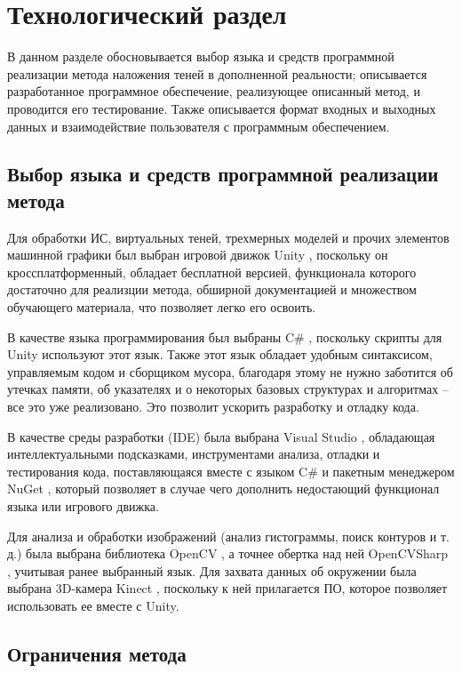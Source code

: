 \chapter{Технологический раздел}

В данном разделе обосновывается выбор языка и средств программной реализации метода наложения теней в дополненной реальности; описывается разработанное программное обеспечение, реализующее описанный метод, и проводится его тестирование. Также описывается формат входных и выходных данных и взаимодействие пользователя с программным обеспечением.

\section{Выбор языка и средств программной реализации метода}

Для обработки ИС, виртуальных теней, трехмерных моделей и прочих элементов машинной графики был выбран игровой движок Unity \cite{unity}, поскольку он кроссплатформенный, обладает бесплатной версией, функционала которого достаточно для реализции метода, обширной документацией и множеством обучающего материала, что позволяет легко его освоить. 

В качестве языка программирования был выбраны C\# \cite{c-sharp}, поскольку скрипты для Unity используют этот язык. Также этот язык обладает удобным синтаксисом, управляемым кодом и сборщиком мусора, благодаря этому не нужно заботится об утечках памяти, об указателях и о некоторых базовых структурах и алгоритмах -- все это уже реализовано. Это позволит ускорить разработку и отладку кода.

В качестве среды разработки (IDE) была выбрана Visual Studio \cite{vs}, обладающая интеллектуальными подсказками, инструментами анализа, отладки и тестирования кода, поставляющаяся вместе с языком C\# и пакетным менеджером NuGet \cite{nuget}, который позволяет в случае чего дополнить недостающий функционал языка или игрового движка.

Для анализа и обработки изображений (анализ гистограммы, поиск контуров и т. д.) была выбрана библиотека OpenCV \cite{opencv}, а точнее обертка над ней OpenCVSharp \cite{opencvsharp}, учитывая ранее выбранный язык. Для захвата данных об окружении была выбрана 3D-камера Kinect \cite{kinect}, поскольку к ней прилагается ПО, которое позволяет использовать ее вместе с Unity.

\section{Ограничения метода}

